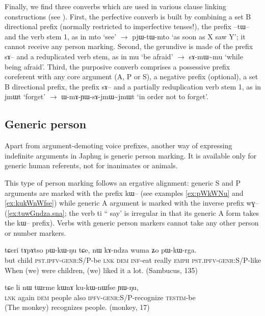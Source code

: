 \documentclass[oldfontcommands,oneside,a4paper,11pt]{article}
\newcommand{\ipa}[1]{{\phon#1}} %
\begin{document}
Finally, we find three converbs which are used in various clause linking constructions (see \citealt{jacques14linking}). First, the perfective converb is built by combining a set B directional prefix (normally restricted to imperfective tenses!),  the prefix \ipa{--tɯ--} and the verb stem 1, as in \ipa{mto} `see' $\rightarrow$ \ipa{pjɯ-tɯ-mto} `as soon as X saw Y'; it cannot receive any person marking. Second, the gerundive is made of the prefix \ipa{sɤ--} and a reduplicated verb stem, as in \ipa{mu} `be afraid' $\rightarrow$ \ipa{sɤ-mɯ\textasciitilde{}mu} `while being afraid'. Third, the purposive converb comprises a possessive prefix coreferent with any core argument (A, P or S), a negative prefix (optional), a set B directional prefix, the prefix \ipa{sɤ--} and a partially reduplication verb stem 1, as in \ipa{jmɯt} `forget' $\rightarrow$ \ipa{ɯ-mɤ-ɲɯ-sɤ-jmɯ\textasciitilde{}jmɯt} `in order not to forget'.

\subsection{Generic person}
Apart from argument-demoting voice prefixes, another way of expressing indefinite arguments in Japhug is generic person marking. It is available only for generic human referents, not for inanimates or animals.

This type of person marking follows an ergative alignment: generic S and P arguments are marked with the prefix \ipa{kɯ--} (see examples \ref{ex:pWkWNu} and \ref{ex:kukWnWfse}) while generic A argument is marked with the inverse prefix \ipa{wɣ--} (\ref{ex:tuwGndza.sna}; the verb \ipa{ti} `` say' is irregular in that its generic A form takes the \ipa{kɯ--} prefix).  Verbs with generic person markers cannot take any other person or number markers.


\begin{exe}
\ex \label{ex:pWkWNu}
\gll
\ipa{tɕeri} 	\ipa{tɤpɤtso} 	\ipa{pɯ-kɯ-ŋu} 	\ipa{tɕe,} 	\ipa{nɯ} 	\ipa{kɤ-ndza} 	\ipa{wuma} 	\ipa{ʑo} 	\ipa{pɯ-kɯ-rga.} \\
but child \textsc{pst.ipfv-genr}:S/P-be \textsc{lnk} \textsc{dem} \textsc{inf}-eat really \textsc{emph} \textsc{pst.ipfv-genr}:S/P-like \\
\glt When (we) were children, (we) liked it a lot. (Sambucus, 135)
\end{exe}


\begin{exe}
\ex \label{ex:kukWnWfse}
\gll
\ipa{tɕe}  	\ipa{li}  	\ipa{nɯ}  	\ipa{tɯrme}  	\ipa{kɯnɤ}  	\ipa{ku-kɯ-nɯfse}  	\ipa{ɲɯ-ŋu,}\\
\textsc{lnk} again \textsc{dem} people also \textsc{ipfv-genr:S/P}-recognize \textsc{testim}-be\\
\glt  (The monkey) recognizes people. (monkey, 17)
\end{exe}
\end{document}
